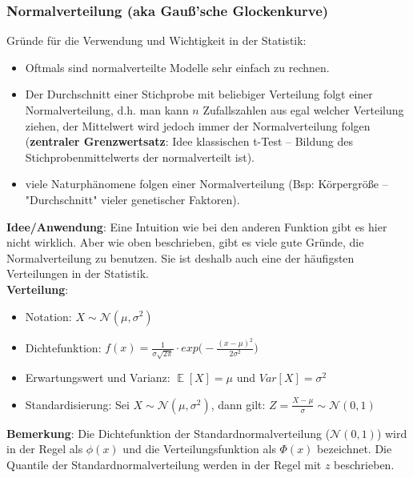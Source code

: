 \documentclass[a4paper]{article}
\DeclareMathOperator*{\E}{\mathbb{E}}
\begin{document}
\subsubsection{Normalverteilung (aka Gauß'sche Glockenkurve)} \label{sec:Norm}

Gründe für die Verwendung und Wichtigkeit in der Statistik:

\begin{itemize}
    \item Oftmals sind normalverteilte Modelle sehr einfach zu rechnen.
    \item Der Durchschnitt einer Stichprobe mit beliebiger Verteilung folgt einer Normalverteilung, d.h. man kann $n$ Zufallszahlen aus egal welcher Verteilung ziehen, der Mittelwert wird jedoch immer der Normalverteilung folgen (\textbf{zentraler Grenzwertsatz}: Idee klassischen t-Test -- Bildung des Stichprobenmittelwerts der normalverteilt ist).
    \item viele Naturphänomene folgen einer Normalverteilung (Bsp: Körpergröße -- "Durchschnitt" vieler genetischer Faktoren).
\end{itemize}

\noindent \textbf{Idee/Anwendung}: Eine Intuition wie bei den anderen Funktion gibt es hier nicht wirklich. Aber wie oben beschrieben, gibt es viele gute Gründe, die Normalverteilung zu benutzen. Sie ist deshalb auch eine der häufigsten Verteilungen in der Statistik. \\

\noindent \textbf{Verteilung}:
\begin{itemize}
\item[] Notation: $X \sim \mathcal{N}(\mu,\sigma^2)$
\item[] Dichtefunktion: $f(x)=\frac{1}{\sigma\sqrt{2\pi}} \cdot exp \Big(-\frac{(x-\mu)^2}{2 \sigma^2}\Big)$
\item[] Erwartungswert und Varianz: $\E[X]=\mu$ und $Var[X]=\sigma^2$
\item[] Standardisierung: Sei $X \sim \mathcal{N}(\mu,\sigma^2)$, dann gilt: $Z=\frac{X-\mu}{\sigma} \sim \mathcal{N}(0,1)$

\end{itemize}

\noindent \textbf{Bemerkung}: Die Dichtefunktion der Standardnormalverteilung ($\mathcal{N}(0,1)$) wird in der Regel als $\phi(x)$ und die Verteilungsfunktion als $\Phi(x)$ bezeichnet. Die Quantile der Standardnormalverteilung werden in der Regel mit $z$ beschrieben.
\end{document}
